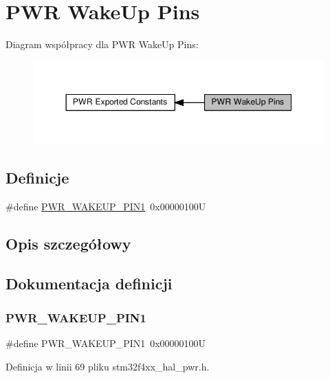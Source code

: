 \hypertarget{group___p_w_r___wake_up___pins}{}\section{P\+WR Wake\+Up Pins}
\label{group___p_w_r___wake_up___pins}
Diagram współpracy dla P\+WR Wake\+Up Pins\+:\nopagebreak
\begin{figure}[H]
\begin{center}
\leavevmode
\includegraphics[width=350pt]{group___p_w_r___wake_up___pins}
\end{center}
\end{figure}
\subsection*{Definicje}
\begin{DoxyCompactItemize}
\item 
\#define \hyperlink{group___p_w_r___wake_up___pins_ga0da8e7cbe0826e93b777ae4419a1cd05}{P\+W\+R\+\_\+\+W\+A\+K\+E\+U\+P\+\_\+\+P\+I\+N1}~0x00000100U
\end{DoxyCompactItemize}


\subsection{Opis szczegółowy}


\subsection{Dokumentacja definicji}
\mbox{\label{group___p_w_r___wake_up___pins_ga0da8e7cbe0826e93b777ae4419a1cd05}} 
\subsubsection{\texorpdfstring{P\+W\+R\+\_\+\+W\+A\+K\+E\+U\+P\+\_\+\+P\+I\+N1}{PWR\_WAKEUP\_PIN1}}
{\footnotesize\ttfamily \#define P\+W\+R\+\_\+\+W\+A\+K\+E\+U\+P\+\_\+\+P\+I\+N1~0x00000100U}



Definicja w linii 69 pliku stm32f4xx\+\_\+hal\+\_\+pwr.\+h.

